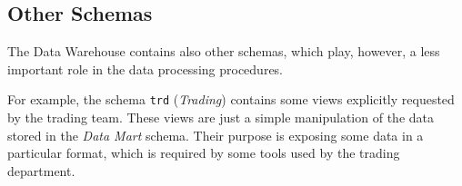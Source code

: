 \subsection{Other Schemas}
    The Data Warehouse contains also other schemas, which play, however, a less important role in the data processing procedures.
    
    For example, the schema \texttt{trd} (\textit{Trading}) contains some views explicitly requested by the trading team.
    These views are just a simple manipulation of the data stored in the \textit{Data Mart} schema.
    Their purpose is exposing some data in a particular format, which is required by some tools used by the trading department.
    

